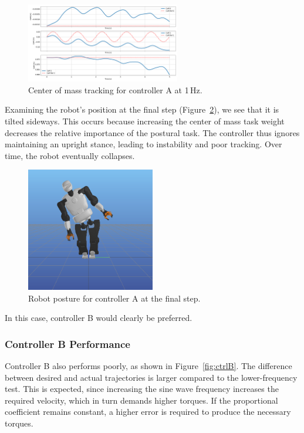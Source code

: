 \documentclass[12pt]{article}
\begin{document}
\begin{figure}[h!]
\centering
\includegraphics[width=0.6\textwidth]{./images/3.3.1.png}
\caption{Center of mass tracking for controller A at 1\,Hz.}
\label{fig:ctrlA}
\end{figure}

Examining the robot’s position at the final step (Figure~\ref{fig:ctrlA_robot}), we see that it is tilted sideways.  
This occurs because increasing the center of mass task weight decreases the relative importance of the postural task.  
The controller thus ignores maintaining an upright stance, leading to instability and poor tracking.  
Over time, the robot eventually collapses.

\begin{figure}[h!]
\centering
\includegraphics[width=0.5\textwidth]{./images/3.3.1.robot.png}
\caption{Robot posture for controller A at the final step.}
\label{fig:ctrlA_robot}
\end{figure}

In this case, controller B would clearly be preferred.

\subsubsection{Controller B Performance}

Controller B also performs poorly, as shown in Figure~\ref{fig:ctrlB}.  
The difference between desired and actual trajectories is larger compared to the lower-frequency test.
This is expected, since increasing the sine wave frequency increases the required velocity, which in turn demands higher torques.  
If the proportional coefficient remains constant, a higher error is required to produce the necessary torques.
\end{document}
